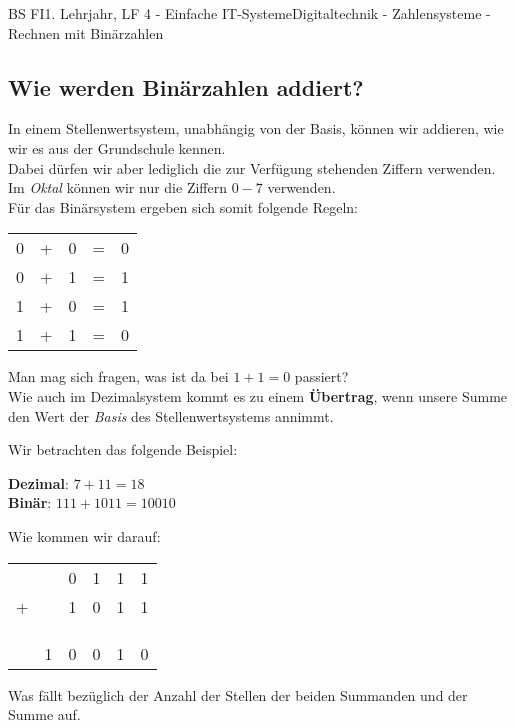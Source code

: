 \documentclass[11pt,twocolumn,oneside,openany,headings=optiontotoc,11pt,numbers=noenddot]{article}
\begin{document}
\begin{worksheet}{BS FI}{1. Lehrjahr, LF 4 - Einfache IT-Systeme}{Digitaltechnik - Zahlensysteme - Rechnen mit Binärzahlen}
		\subsection*{Wie werden Binärzahlen addiert?}
		In einem Stellenwertsystem, unabhängig von der Basis, können wir addieren, wie wir es aus der Grundschule kennen.\\
		Dabei dürfen wir aber lediglich die zur Verfügung stehenden Ziffern verwenden.\\
		\tiny{Im \textit{Oktal} können wir nur die Ziffern \(0 - 7\) verwenden.}\normalsize\\
		Für das Binärsystem ergeben sich somit folgende Regeln:\\
		\begin{tabularx}{0.48\textwidth}{ccccc}
			0 & + & 0 & = & 0\\
			0 & + & 1 & = & 1\\
			1 & + & 0 & = & 1\\
			1 & + & 1 & = & 0
		\end{tabularx}
		\par\noindent
		Man mag sich fragen, was ist da bei \(1 + 1 = 0\) passiert?\\
		Wie auch im Dezimalsystem kommt es zu einem \textbf{Übertrag}, wenn unsere Summe den Wert der \textit{Basis} des Stellenwertsystems annimmt.\\
		\newpage
		\begin{framed}
			\noindent
			Wir betrachten das folgende Beispiel:\\
			\par\noindent
			\textbf{Dezimal}: \(7 + 11 = 18\)\\
			\textbf{Binär}: \( 111 + 1011 = 10010\)\\
			\par\noindent
			Wie kommen wir darauf:\\
			\begin{tabularx}{0.4\textwidth}{llllll}
				& & 0 & 1 & 1 & 1\\
				+ & & 1 & 0 & 1 & 1\\
				\\
				\tiny{\color{codegray}{Übertrag}} & \color{codegray}{1} & \color{codegray}{1} & \color{codegray}{1} & \color{codegray}{1} & \\
				\cline{1-6}
				\\
				& 1 & 0 & 0 & 1 & 0\\
				\cline{2-6}
			\end{tabularx}
		\end{framed}
		\noindent
		Was fällt bezüglich der Anzahl der Stellen der beiden Summanden und der Summe auf.
	\end{worksheet}
\end{document}

